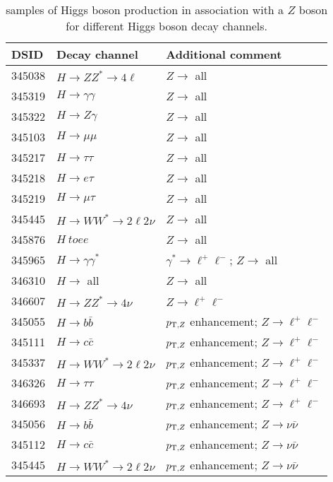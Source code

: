 \begin{table}[!htbp]
  \caption{\POWPY[8] samples of Higgs boson production in association with a $Z$ boson for different Higgs boson decay channels.}%
  \label{tab:higgs-ZH-samples}
  \centering
  \begin{tabular}{ l l l}
    \toprule
    DSID   & Decay channel & Additional comment \\
    \midrule
    345038 & $H \to ZZ^{*} \to 4\ell$ & $Z\to$ all\\
    345319 & $H \to \gamma\gamma$ & $Z\to$ all\\
    345322 & $H \to Z\gamma$ & $Z\to$ all\\
    345103 & $H \to\mu\mu$ & $Z\to$ all\\ 
    345217 & $H \to\tau\tau$& $Z\to$ all\\ 
    345218 & $H \to e\tau$ &$Z\to$ all\\
    345219 & $H \to \mu\tau$&$Z\to$ all\\
    345445 & $H \to WW^{*} \to 2\ell2\nu $ & $Z\to$ all \\
    345876 & $H\ to ee$ &$Z\to$ all \\
    345965 & $H \to \gamma\gamma^{*}$ & $\gamma^{*}\to \ell^{+}\ell^{-}$; $Z\to$ all\\
    346310 & $H \to$ all&$Z\to$ all\\
    346607 & $H \to ZZ^{*} \to 4\nu $ &$Z\to \ell^{+}\ell^{-}$ \\
    345055 & $H \to b\bar{b}$ & $p_{{\textrm T},Z}$ enhancement; $Z\to \ell^{+}\ell^{-}$\\
    345111 & $H \to c\bar{c}$ & $p_{{\textrm T},Z}$ enhancement; $Z\to \ell^{+}\ell^{-}$\\
    345337 & $H \to WW^{*} \to 2\ell2\nu $ &$p_{{\textrm T},Z}$ enhancement; $Z\to \ell^{+}\ell^{-}$\\
    346326 & $H \to\tau\tau$& $p_{{\textrm T},Z}$ enhancement; $Z\to \ell^{+}\ell^{-}$\\
    346693 & $H \to ZZ^{*} \to 4\nu $ & $p_{{\textrm T},Z}$ enhancement; $Z\to \ell^{+}\ell^{-}$\\
    345056 & $H \to b\bar{b}$ & $p_{{\textrm T},Z}$ enhancement; $Z\to \nu\bar{\nu}$\\
    345112 & $H \to c\bar{c}$ & $p_{{\textrm T},Z}$ enhancement; $Z\to \nu\bar{\nu}$\\
    345445 & $H \to WW^{*} \to 2\ell2\nu$  & $p_{{\textrm T},Z}$ enhancement; $Z\to \nu\bar{\nu}$\\
    \bottomrule
  \end{tabular}
\end{table}


